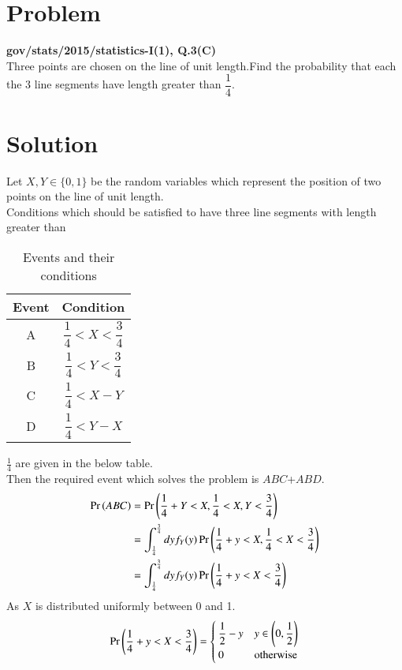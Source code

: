 \documentclass[journal,12pt,twocolumn]{IEEEtran}
\begin{document}
\section{Problem}
\textbf{gov/stats/2015/statistics-I(1), Q.3(C)}\\
  Three points are chosen on the line of unit length.Find the probability that each the 3 line segments have length greater than $\dfrac{1}{4}$.
\section{Solution}
 Let $X,Y \in \{0,1\}$ be the random variables which represent the position of two points on the line of unit length.\\
Conditions which should be satisfied to have three line segments with length greater than 
\begin{table}[h]
\centering
\bgroup
\def\arraystretch{2}
\begin{tabular}{|c|c|}
\hline
\textbf{Event} & \textbf{Condition}                     \\\hline
A              & $\dfrac{1}{4}<X<\dfrac{3}{4}$ \\[1ex] \hline
B              & $\dfrac{1}{4}<Y<\dfrac{3}{4}$ \\[1ex] \hline
C              & $\dfrac{1}{4}<X-Y$ \\[1ex] \hline
D           & $\dfrac{1}{4}<Y-X$ \\[1ex] \hline
\end{tabular}
\egroup
\caption{Events and their conditions}
\label{tab:Events}
\end{table}
$\frac{1}{4}$ are given in the below table.\\
Then the required event which solves the problem is $ABC$+$ABD$.
\begin{align}
    \Pr\left(ABC\right)&=\Pr\left(\frac{1}{4}+Y<X,\frac{1}{4}<X,Y<\frac{3}{4}\right)\\
    &=\int_{\frac{1}{4}}^{\frac{3}{4}}dyf_Y(y) \Pr\left(\frac{1}{4}+y<X,\frac{1}{4}<X<\frac{3}{4}\right)\\
     &=\int_{\frac{1}{4}}^{\frac{3}{4}}dyf_Y(y)\Pr\left(\frac{1}{4}+y<X<\frac{3}{4}\right)\label{step2}
     \end{align}
     As $X$ is distributed uniformly between 0 and 1.
     \begin{align}
        \Pr\left(\frac{1}{4}+y<X<\frac{3}{4}\right)=\begin{cases}
        \dfrac{1}{2}-y&y\in \left(0,\dfrac{1}{2}\right)\\
        0&\text{otherwise}
        \end{cases}\label{step2help}
     \end{align}
\end{document}
